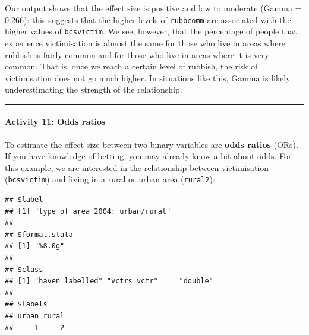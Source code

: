 \documentclass[
]{book}
\newenvironment{Shaded}{\begin{snugshade}}{\end{snugshade}}
\newcommand{\AttributeTok}[1]{\textcolor[rgb]{0.77,0.63,0.00}{#1}}
\newcommand{\CommentTok}[1]{\textcolor[rgb]{0.56,0.35,0.01}{\textit{#1}}}
\newcommand{\ConstantTok}[1]{\textcolor[rgb]{0.00,0.00,0.00}{#1}}
\newcommand{\FunctionTok}[1]{\textcolor[rgb]{0.00,0.00,0.00}{#1}}
\newcommand{\NormalTok}[1]{#1}
\newcommand{\OtherTok}[1]{\textcolor[rgb]{0.56,0.35,0.01}{#1}}
\newcommand{\SpecialCharTok}[1]{\textcolor[rgb]{0.00,0.00,0.00}{#1}}
\newcommand{\StringTok}[1]{\textcolor[rgb]{0.31,0.60,0.02}{#1}}
\begin{document}
Our output shows that the effect size is positive and low to moderate (Gamma = 0.266): this suggests that the higher levels of \texttt{rubbcomm} are associated with the higher values of \texttt{bcsvictim}. We see, however, that the percentage of people that experience victimisation is almost the same for those who live in areas where rubbish is fairly common and for those who live in areas where it is very common. That is, once we reach a certain level of rubbish, the risk of victimisation does not go much higher. In situations like this, Gamma is likely underestimating the strength of the relationship.

\begin{center}\rule{0.5\linewidth}{0.5pt}\end{center}

\hypertarget{activity-11-odds-ratios}{%
\paragraph{Activity 11: Odds ratios}\label{activity-11-odds-ratios}}

To estimate the effect size between two binary variables are \textbf{odds ratios} (ORs). If you have knowledge of betting, you may already know a bit about odds. For this example, we are interested in the relationship between victimisation (\texttt{bcsvictim}) and living in a rural or urban area (\texttt{rural2}):

\begin{Shaded}
\end{Shaded}

\begin{verbatim}
## $label
## [1] "type of area 2004: urban/rural"
## 
## $format.stata
## [1] "%8.0g"
## 
## $class
## [1] "haven_labelled" "vctrs_vctr"     "double"        
## 
## $labels
## urban rural 
##     1     2
\end{verbatim}

\begin{Shaded}
\end{Shaded}
\end{document}
